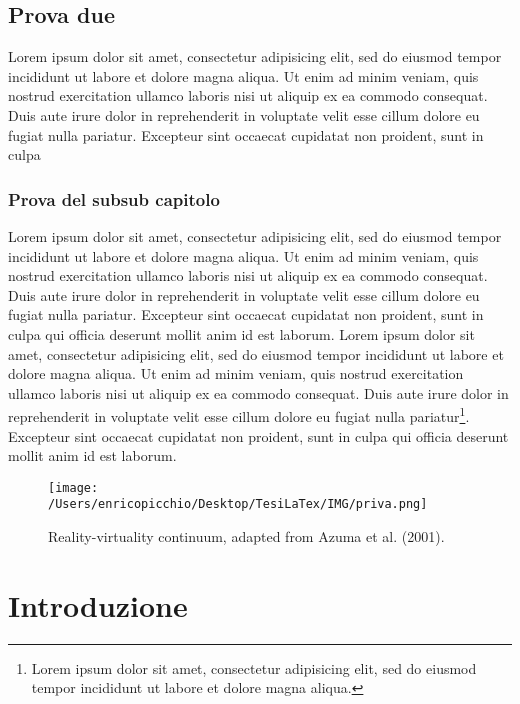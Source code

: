 \documentclass[11pt,a4paper]{article}
\begin{document}
\subsection{Prova due}
Lorem ipsum dolor sit amet, consectetur adipisicing elit, sed do eiusmod tempor incididunt ut labore et dolore magna aliqua. Ut enim ad minim veniam, quis nostrud exercitation ullamco laboris nisi ut aliquip ex ea commodo consequat. Duis aute irure dolor in reprehenderit in voluptate velit esse cillum dolore eu fugiat nulla pariatur. Excepteur sint occaecat cupidatat non proident, sunt in culpa

\subsubsection{Prova del subsub capitolo}
Lorem ipsum dolor sit amet, consectetur adipisicing elit, sed do eiusmod tempor incididunt ut labore et dolore magna aliqua. Ut enim ad minim veniam, quis nostrud exercitation ullamco laboris nisi ut aliquip ex ea commodo consequat. Duis aute irure dolor in reprehenderit in voluptate velit esse cillum dolore eu fugiat nulla pariatur. Excepteur sint occaecat cupidatat non proident, sunt in culpa qui officia deserunt mollit anim id est laborum.
Lorem ipsum dolor sit amet, consectetur adipisicing elit, sed do eiusmod tempor incididunt ut labore et dolore magna aliqua. Ut enim ad minim veniam, quis nostrud exercitation ullamco laboris nisi ut aliquip ex ea commodo consequat. Duis aute irure dolor in reprehenderit in voluptate velit esse cillum dolore eu fugiat nulla pariatur\footnote{Lorem ipsum dolor sit amet, consectetur adipisicing elit, sed do eiusmod tempor incididunt ut labore et dolore magna aliqua.}. Excepteur sint occaecat cupidatat non proident, sunt in culpa qui officia deserunt mollit anim id est laborum.

\begin{figure}[h!]
\centerline {\texttt{[image: /Users/enricopicchio/Desktop/TesiLaTex/IMG/priva.png]}}
\caption{Reality-virtuality continuum, adapted from
Azuma et al. (2001).}
\end{figure}

\newpage
\section{Introduzione}
\vspace{0.38cm}
\end{document}
